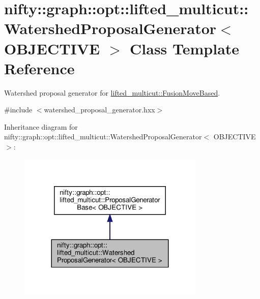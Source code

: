 \hypertarget{classnifty_1_1graph_1_1opt_1_1lifted__multicut_1_1WatershedProposalGenerator}{}\section{nifty\+:\+:graph\+:\+:opt\+:\+:lifted\+\_\+multicut\+:\+:Watershed\+Proposal\+Generator$<$ O\+B\+J\+E\+C\+T\+I\+VE $>$ Class Template Reference}
\label{classnifty_1_1graph_1_1opt_1_1lifted__multicut_1_1WatershedProposalGenerator}


Watershed proposal generator for \hyperlink{classnifty_1_1graph_1_1opt_1_1lifted__multicut_1_1FusionMoveBased}{lifted\+\_\+multicut\+::\+Fusion\+Move\+Based}.  




{\ttfamily \#include $<$watershed\+\_\+proposal\+\_\+generator.\+hxx$>$}



Inheritance diagram for nifty\+:\+:graph\+:\+:opt\+:\+:lifted\+\_\+multicut\+:\+:Watershed\+Proposal\+Generator$<$ O\+B\+J\+E\+C\+T\+I\+VE $>$\+:
\nopagebreak
\begin{figure}[H]
\begin{center}
\leavevmode
\includegraphics[width=252pt]{classnifty_1_1graph_1_1opt_1_1lifted__multicut_1_1WatershedProposalGenerator__inherit__graph}
\end{center}
\end{figure}


